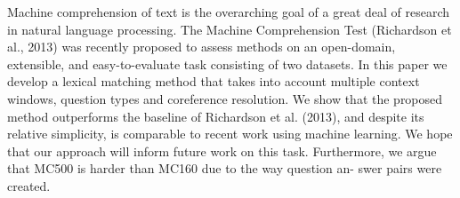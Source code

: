 Machine comprehension of text is the overarching goal of a great deal of research in natural language processing. The Machine Comprehension Test (Richardson et al., 2013) was recently proposed to assess methods on an open-domain, extensible, and easy-to-evaluate task consisting of two datasets. In this paper we develop a lexical matching method that takes into account multiple context windows, question types and coreference resolution. We show that the proposed method outperforms the baseline of Richardson et al. (2013), and despite its relative simplicity, is comparable to recent work using machine learning. We hope that our approach will inform future work on this task. Furthermore, we argue that MC500 is harder than MC160 due to the way question an- swer pairs were created.
